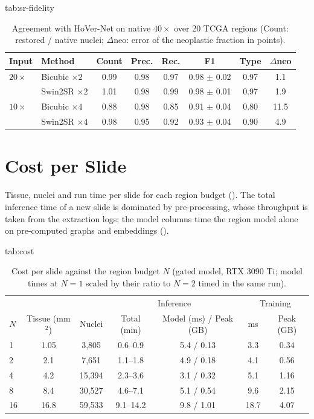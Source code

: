 \documentclass{midl} %
\begin{document}
\begin{table}[!ht]
\floatconts
  {tab:sr-fidelity}
  {\caption{Agreement with HoVer-Net on native $40\times$ over 20 TCGA regions (Count: restored / native nuclei; $\Delta$neo: error of the neoplastic fraction in points).}}
  {\small
  \begin{tabular}{llcccccc}
  \hline
  Input & Method & Count & Prec. & Rec. & F1 & Type & $\Delta$neo \\
  \hline
  $20\times$ & Bicubic $\times 2$  & 0.99 & 0.98 & 0.97 & 0.98 $\pm$ 0.02 & 0.97 & 1.1 \\
             & Swin2SR $\times 2$  & 1.01 & 0.98 & 0.99 & 0.98 $\pm$ 0.01 & 0.97 & 1.9 \\
  \hline
  $10\times$ & Bicubic $\times 4$  & 0.88 & 0.98 & 0.85 & 0.91 $\pm$ 0.04 & 0.80 & 11.5 \\
             & Swin2SR $\times 4$  & 0.98 & 0.95 & 0.92 & 0.93 $\pm$ 0.04 & 0.90 & 4.9 \\
  \hline
  \end{tabular}}
\end{table}

\clearpage  %
\section{Cost per Slide}
\label{app:cost}

Tissue, nuclei and run time per slide for each region budget (). The total
inference time of a new slide is dominated by pre-processing, whose throughput is taken from the
extraction logs; the model columns time the region model alone on pre-computed graphs and
embeddings ().

\begin{table}[!ht]
\floatconts
  {tab:cost}
  {\caption{Cost per slide against the region budget $N$ (gated model, RTX 3090 Ti; model times at $N=1$ scaled by their ratio to $N=2$ timed in the same run).}}
  {\small
  \begin{tabular}{lcccccc}
  \hline
   & & & \multicolumn{2}{c}{Inference} & \multicolumn{2}{c}{Training} \\
  $N$ & Tissue (mm$^2$) & Nuclei & Total (min) & Model (ms) / Peak (GB) & ms & Peak (GB) \\
  \hline
  1  & 1.05 & 3,805  & 0.6--0.9  & 5.4 / 0.13 & 3.3  & 0.34 \\
  2  & 2.1  & 7,651  & 1.1--1.8  & 4.9 / 0.18 & 4.1  & 0.56 \\
  4  & 4.2  & 15,394 & 2.3--3.6  & 3.1 / 0.32 & 5.1  & 1.16 \\
  8  & 8.4  & 30,527 & 4.6--7.1  & 5.1 / 0.54 & 9.6  & 2.15 \\
  16 & 16.8 & 59,533 & 9.1--14.2 & 9.8 / 1.01 & 18.7 & 4.07 \\
  \hline
  \end{tabular}}
\end{table}
\end{document}
